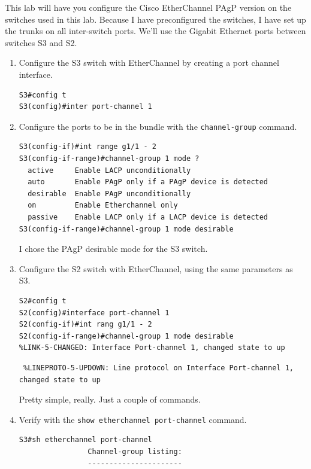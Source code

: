 This lab will have you configure the Cisco EtherChannel PAgP version on
the switches used in this lab. Because I have preconfigured the
switches, I have set up the trunks on all inter-switch ports. We'll use
the Gigabit Ethernet ports between switches S3 and S2.

\begin{enumerate}
\item
  Configure the S3 switch with EtherChannel by creating a port channel
  interface.

\begin{verbatim}
S3#config t
S3(config)#inter port-channel 1
\end{verbatim}
\item
  Configure the ports to be in the bundle with the
  \texttt{channel-group} command.

\begin{verbatim}
S3(config-if)#int range g1/1 - 2
S3(config-if-range)#channel-group 1 mode ?
  active     Enable LACP unconditionally
  auto       Enable PAgP only if a PAgP device is detected
  desirable  Enable PAgP unconditionally
  on         Enable Etherchannel only
  passive    Enable LACP only if a LACP device is detected
S3(config-if-range)#channel-group 1 mode desirable
\end{verbatim}

  I chose the PAgP desirable mode for the S3 switch.
\item
  Configure the S2 switch with EtherChannel, using the same parameters
  as S3.

\begin{verbatim}
S2#config t
S2(config)#interface port-channel 1
S2(config-if)#int rang g1/1 - 2
S2(config-if-range)#channel-group 1 mode desirable
%LINK-5-CHANGED: Interface Port-channel 1, changed state to up
\end{verbatim}

\begin{verbatim}
 %LINEPROTO-5-UPDOWN: Line protocol on Interface Port-channel 1, changed state to up
\end{verbatim}

  Pretty simple, really. Just a couple of commands.
\item
  Verify with the \texttt{show\ etherchannel\ port-channel} command.

\begin{verbatim}
S3#sh etherchannel port-channel
                Channel-group listing:
                ----------------------


\end{verbatim}
\end{enumerate}
